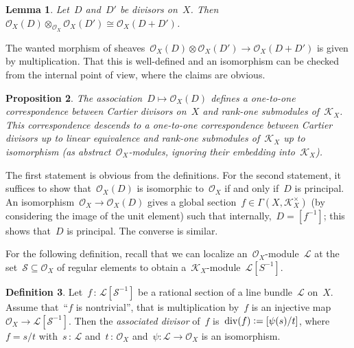 \documentclass[10pt,reqno,a4paper]{amsbook}
\makeatletter
\theoremstyle{definition}
\newtheorem{defn}{Definition}[section]
\theoremstyle{plain}
\newtheorem{prop}[defn]{Proposition}
\newtheorem{lemma}[defn]{Lemma}
\theoremstyle{remark}
\newtheorem{rem}[defn]{Remark}
\renewcommand{\O}{\mathcal{O}}
\newcommand{\K}{\mathcal{K}}
\renewcommand{\L}{\mathcal{L}}
\renewcommand{\S}{\mathcal{S}}
\newcommand{\?}{\,{:}\,}
\renewcommand{\_}{\mathpunct{.}\,}
\newcommand{\effective}{ef{}fective\xspace}
\newcommand{\defeq}{\vcentcolon=}
\renewenvironment{proof}[1][\proofname]{\par
  \pushQED{\qed}%
  \normalfont \topsep6\p@\@plus6\p@\relax
  \trivlist
  \item[\hskip\labelsep
        \itshape
    #1\@addpunct{.}]\ignorespaces
}{%
  \popQED\endtrivlist\@endpefalse
}
\makeatother
\begin{document}
\begin{lemma}Let~$D$ and~$D'$ be divisors on~$X$. Then~$\O_X(D) \otimes_{\O_X}
\O_X(D') \cong \O_X(D + D')$.\end{lemma}
\begin{proof}The wanted morphism of sheaves~$\O_X(D) \otimes \O_X(D') \to
\O_X(D + D')$ is given by multiplication. That this is well-defined and an
isomorphism can be checked from the internal point of view, where the claims
are obvious.\end{proof}

\begin{prop}The association~$D \mapsto \O_X(D)$ defines a one-to-one
correspondence between Cartier divisors on~$X$ and rank-one submodules
of~$\K_X$. This correspondence descends to a one-to-one correspondence between
Cartier divisors up to linear equivalence and rank-one submodules of~$\K_X$ up
to isomorphism (as abstract~$\O_X$-modules, ignoring their embedding
into~$\K_X$).\end{prop}
\begin{proof}The first statement is obvious from the definitions. For the
second statement, it suffices to show that~$\O_X(D)$ is isomorphic to~$\O_X$ if
and only if~$D$ is principal. An isomorphism~$\O_X \to \O_X(D)$ gives a
global section~$f \in \Gamma(X,\K_X^\times)$ (by considering the image of the unit element)
such that internally,~$D = [f^{-1}]$; this shows that~$D$ is principal. The
converse is similar.
\end{proof}


For the following definition, recall that we can localize an~$\O_X$-module~$\L$
at the set~$\S \subseteq \O_X$ of regular elements to obtain
a~$\K_X$-module~$\L[S^{-1}]$.

\begin{defn}Let~$f\?\L[\S^{-1}]$ be a rational section of a line bundle~$\L$
on~$X$. Assume that~``$f$ is nontrivial'', that is multiplication by~$f$ is an
injective map~$\O_X \to \L[\S^{-1}]$. Then the \emph{associated divisor} of~$f$
is~$\operatorname{div}(f) \defeq [\psi(s)/t]$, where~$f = s/t$ with~$s\?\L$ and~$t\?\O_X$
and~$\psi : \L \to \O_X$ is an isomorphism.\end{defn}
\end{document}
